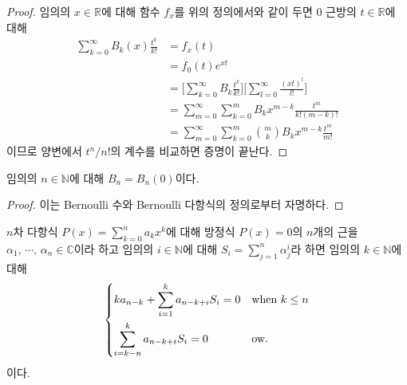\begin{proof}
    임의의 $x\in\mathbb{R}$에 대해 함수 $f_x$를 위의 정의에서와 같이 두면 $0$ 근방의 $t\in\mathbb{R}$에 대해
    \begin{align*}
        \sum_{k=0}^\infty B_k(x)\frac{t^k}{k!}&=f_x(t)\\
        &=f_0(t)e^{xt}\\
        &=\bigg[\sum_{k=0}^\infty B_k\frac{t^k}{k!}\bigg]\bigg[\sum_{l=0}^\infty\frac{(xt)^l}{l!}\bigg]\\
        &=\sum_{m=0}^\infty\sum_{k=0}^mB_kx^{m-k}\frac{t^m}{k!(m-k)!}\\
        &=\sum_{m=0}^\infty\sum_{k=0}^m\binom{m}{k}B_kx^{m-k}\frac{t^m}{m!}
    \end{align*}
    이므로 양변에서 $t^n/n!$의 계수를 비교하면 증명이 끝난다.
\end{proof}

\begin{corollary}
    임의의 $n\in\mathbb{N}$에 대해 $B_n=B_n(0)$이다.
\end{corollary}

\begin{proof}
    이는 Bernoulli 수와 Bernoulli 다항식의 정의로부터 자명하다.
\end{proof}

\begin{lemma}
    $n$차 다항식 $P(x)=\sum_{k=0}^na_kx^k$에 대해 방정식 $P(x)=0$의 $n$개의 근을 $\alpha_1,\,\cdots,\,\alpha_n\in\mathbb{C}$이라 하고 임의의 $i\in\mathbb{N}$에 대해 $S_i=\sum_{j=1}^n\alpha_j^i$라 하면 임의의 $k\in\mathbb{N}$에 대해
    \begin{equation*}
        \begin{dcases*}
            ka_{n-k}+\sum_{i=1}^ka_{n-k+i}S_i=0&when $k\leq n$\\
            \sum_{i=k-n}^ka_{n-k+i}S_i=0&ow.
        \end{dcases*}
    \end{equation*}
    이다.
\end{lemma}

